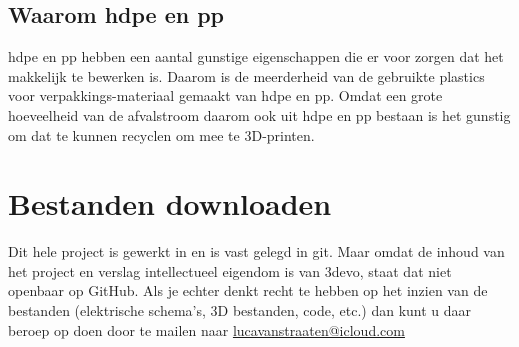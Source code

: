 \subsection{Waarom \ac{hdpe} en \ac{pp}}

\ac{hdpe} en \ac{pp} hebben een aantal gunstige eigenschappen die er voor
zorgen dat het makkelijk te bewerken is.  Daarom is de meerderheid van de
gebruikte plastics voor verpakkings-materiaal gemaakt van \ac{hdpe} en \ac{pp}.
Omdat een grote hoeveelheid van de afvalstroom daarom ook uit \ac{hdpe} en
\ac{pp} bestaan is het gunstig om dat te kunnen recyclen om mee te 3D-printen.

\section{Bestanden downloaden}

Dit hele project is gewerkt in en is vast gelegd in git. Maar omdat de inhoud
van het project en verslag intellectueel eigendom is van 3devo, staat dat niet
openbaar op GitHub. Als je echter denkt recht te hebben op het inzien van de
bestanden (elektrische schema's, 3D bestanden, code, etc.) dan kunt u daar
beroep op doen door te mailen naar
\href{mailto:lucavanstraaten@icloud.com}{lucavanstraaten@icloud.com}
